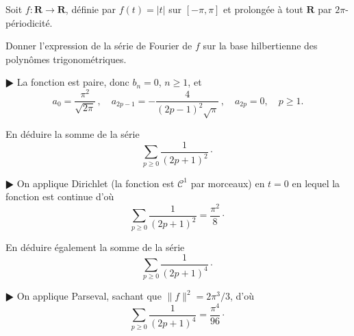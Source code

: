 \documentclass[11pt,a4paper]{article}
\def\R{\mathbf{R}}
\def\CC{\mathscr{C}}
\theoremstyle{plain}
\theoremstyle{definition}
\begin{document}
\begin{Exercice}[6 points]
Soit $f:\R \to \R$, d\'efinie par
$f(t)=|t|$ sur $[-\pi,\pi]$ et prolong\'ee \`a tout $\R$ par $2\pi$-p\'eriodicit\'e.

\begin{Question} Donner l'expression de la s\'erie de Fourier de $f$
sur la base hilbertienne des polyn\^omes trigonom\'etriques.
\end{Question}

\begin{corr} $\RHD$ La fonction est paire, donc $b_n=0$, $n \geq 1$,
et
\[ a_0 = \frac{\pi^2}{\sqrt{2\pi}}\,,\quad
   a_{2p-1} =-\frac{4}{(2p-1)^2\sqrt{\pi}}\,,\quad a_{2p} = 0,\quad p \geq 1. \]
\end{corr}

\begin{Question} En d\'eduire la somme de la s\'erie
\[ \sum_{p \geq 0} \frac{1}{(2p+1)^2} \cdot \] 
\end{Question}

\begin{corr} $\RHD$ On applique Dirichlet (la fonction est $\CC^1$ par morceaux) en
$t=0$ en lequel la fonction est continue
d'o\`u
\[ \sum_{p \geq 0} \frac{1}{(2p+1)^2} = \frac{\pi^2}{8}\cdot \]
\end{corr}

\begin{Question} En d\'eduire \'egalement la somme de la s\'erie
\[ \sum_{p \geq 0} \frac{1}{(2p+1)^4} \cdot \] 
\end{Question}

\begin{corr} $\RHD$ On applique Parseval, sachant que $\|f\|^2=2\pi^3/3$, d'o\`u
\[ \sum_{p \geq 0} \frac{1}{(2p+1)^4} = \frac{\pi^4}{96}\cdot \]
\end{corr}

\end{Exercice} \vspace*{1em}

\end{document}
